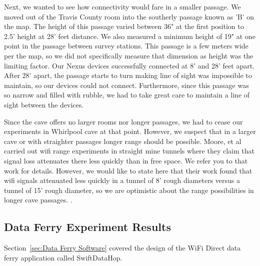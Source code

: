 \documentclass[10pt,twocolumn]{article}
\begin{document}
Next, we wanted to see how connectivity would fare in a smaller passage. 
We moved out of the Travis County room into the southerly passage known as 'B' on the map.
The height of this passage varied between 36" at the first position to 2.5' height at 28' feet distance.
We also measured a minimum height of 19" at one point in the passage between survey stations.
This passage is a few meters wide per the map, so we did not specifically measure that dimension as height was the limiting factor.
Our Nexus devices successfully connected at 8' and 28' feet apart.
After 28' apart, the passage starts to turn making line of sight was impossible to maintain, so our devices could not connect.
Furthermore, since this passage was so narrow and filled with rubble, we had to take great care to maintain a line of sight between the devices.

Since the cave offers no larger rooms nor longer passages, we had to cease our experiments in Whirlpool cave at that point.
However, we suspect that in a larger cave or with straighter passages longer range should be possible.
Moore, et al carried out wifi range experiments in straight mine tunnels where they claim that signal loss attenuates there less quickly than in free space.
We refer you to that work for details.
However, we would like to state here that their work found that wifi signals attenuated less quickly in a tunnel of 8' rough diameters versus a tunnel of 15' rough diameter, so we are optimistic about the range possibilities in longer cave passages. \cite{moore2012}.


\subsection{Data Ferry Experiment Results}
\label{sec:Data Ferry Experiment Results}
Section~\ref{sec:Data Ferry Software} covered the design of the WiFi Direct data ferry application called SwiftDataHop. 
\end{document}
